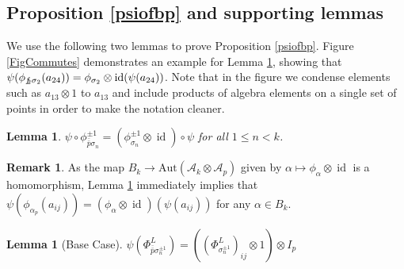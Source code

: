 \documentclass[11pt]{amsart}
\def\A{{\mathcal A}}
\def\s{{\sigma}}
\def\fp{{\scriptstyle \bar{\bar{p}}}}
\newcommand\id{\operatorname{id}}
\newtheorem{lem}[thm]{Lemma}
\theoremstyle{definition}
\newtheorem{rem}[thm]{Remark}
\begin{document}

\subsection{Proposition \ref{psiofbp} and supporting lemmas}
\label{PropAndLemmas}

\noindent We use the following two lemmas to prove Proposition \ref{psiofbp}.  Figure \ref{FigCommutes} demonstrates an example for Lemma \ref{commutes}, showing that $\psi(\phi_{f\hspace*{-3pt}_2\s_2}(a_{24})) = \phi_{\s_2}\otimes\id(\psi(a_{24}))$.  Note that in the figure we condense elements such as $a_{13}\otimes 1$ to $a_{13}$ and include products of algebra elements on a single set of points in order to make the notation cleaner.


\begin{lem}\label{commutes}
$\psi\circ\phi^{\pm 1}_{\fp\s_n} = \left(\phi^{\pm 1}_{\s_n}\otimes \id\right)\circ\psi$ for all $1\le n < k$.
\end{lem}

\begin{rem}As the map $B_{k} \to \text{Aut}(\A_k\otimes\A_p)$ given by $\alpha \mapsto \phi_\alpha\otimes\id$ is a homomorphism, Lemma \ref{commutes} immediately implies that $\psi(\phi_{\alpha_p}(a_{ij})) = (\phi_{\alpha} \otimes \id)(\psi(a_{ij}))$ for any $\alpha\in B_k$.
\end{rem}

\begin{lem}[Base Case]\label{basecase}
$\psi\left(\Phi_{\fp\s^{\pm 1}_n}^L\right) = \left(\left(\Phi_{\s_n^{\pm 1}}^L\right)_{ij}\otimes 1\right)\otimes I_p$
\end{lem}
\end{document}
